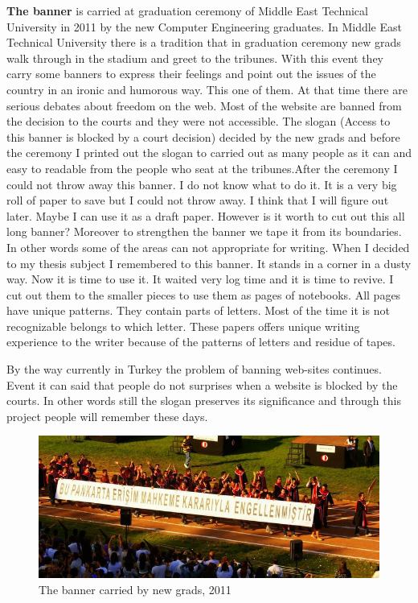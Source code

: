 \textbf{The banner} is carried at graduation ceremony of Middle East Technical University in 2011 by the new Computer Engineering graduates. In Middle East Technical University there is a tradition that in graduation ceremony new grads walk through in the stadium and greet to the tribunes. With this event they carry some banners to express their feelings and point out the issues of the country in an ironic and humorous way. This one of them. At that time there are serious debates about freedom on the web. Most of the website are banned from the decision to the courts and they were not accessible. The slogan (Access to this banner is blocked by a court decision) decided by the new grads and before the ceremony I printed out the slogan to carried out as many people as it can and easy to readable from the people who seat at the tribunes.After the ceremony I could not throw away this banner. I do not know what to do it. It is a very big roll of paper to save but I could not throw away. I think that I will figure out later. Maybe I can use it as a draft paper. However is it worth to cut out this all long banner? Moreover to strengthen the banner we tape it from its boundaries. In other words some of the areas can not appropriate for writing. When I decided to my thesis subject I remembered to this banner. It stands in a corner in a dusty way. Now it is time to use it. It waited very log time and it is time to revive. I cut out them to the smaller pieces to use them as pages of notebooks. All pages have unique patterns. They contain parts of letters. Most of the time it is not recognizable belongs to which letter. These papers offers unique writing experience to the writer because of the patterns of letters and residue of tapes.

By the way currently in Turkey the problem of banning web-sites continues. Event it can said that people do not surprises when a website is blocked by the courts. In other words still the slogan preserves its significance and through this project people will remember these days.

\begin{figure}[h!]
  \centering
  \includegraphics[width=1\textwidth]{project_graphics/banner1.jpg}
  \caption{The banner carried by new grads, 2011}
  \label{fig:Banner_1}
\end{figure}

